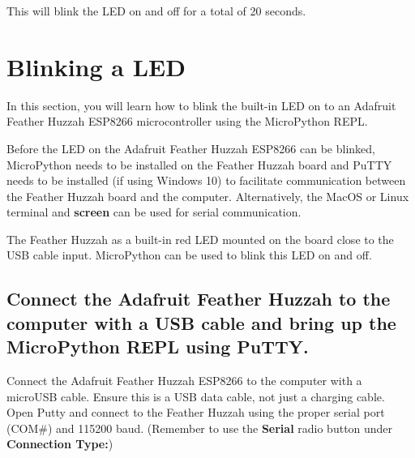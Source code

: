 \documentclass{book}
\begin{document}
This will blink the LED on and off for a total of 20 seconds.
    




    
        \section{Blinking a LED}\label{blinking-a-led}
    




    
        In this section, you will learn how to blink the built-in LED on to an
Adafruit Feather Huzzah ESP8266 microcontroller using the MicroPython
REPL.

Before the LED on the Adafruit Feather Huzzah ESP8266 can be blinked,
MicroPython needs to be installed on the Feather Huzzah board and PuTTY
needs to be installed (if using Windows 10) to facilitate communication
between the Feather Huzzah board and the computer. Alternatively, the
MacOS or Linux terminal and \textbf{screen} can be used for serial
communication.
    




    
        The Feather Huzzah as a built-in red LED mounted on the board close to
the USB cable input. MicroPython can be used to blink this LED on and
off.
    




    
        \subsection{Connect the Adafruit Feather Huzzah to the computer with a
USB cable and bring up the MicroPython REPL using
PuTTY.}\label{connect-the-adafruit-feather-huzzah-to-the-computer-with-a-usb-cable-and-bring-up-the-micropython-repl-using-putty.}
    




    
        Connect the Adafruit Feather Huzzah ESP8266 to the computer with a
microUSB cable. Ensure this is a USB data cable, not just a charging
cable. Open Putty and connect to the Feather Huzzah using the proper
serial port (COM\#) and 115200 baud. (Remember to use the
\textbf{Serial} radio button under \textbf{Connection Type:})
\end{document}
